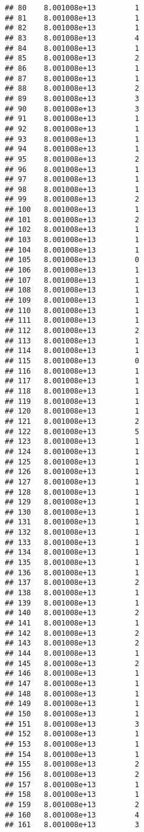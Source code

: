 \documentclass[
]{article}
\begin{document}
\begin{verbatim}
## 80    8.001008e+13         1
## 81    8.001008e+13         1
## 82    8.001008e+13         1
## 83    8.001008e+13         4
## 84    8.001008e+13         1
## 85    8.001008e+13         2
## 86    8.001008e+13         1
## 87    8.001008e+13         1
## 88    8.001008e+13         2
## 89    8.001008e+13         3
## 90    8.001008e+13         3
## 91    8.001008e+13         1
## 92    8.001008e+13         1
## 93    8.001008e+13         1
## 94    8.001008e+13         1
## 95    8.001008e+13         2
## 96    8.001008e+13         1
## 97    8.001008e+13         1
## 98    8.001008e+13         1
## 99    8.001008e+13         2
## 100   8.001008e+13         1
## 101   8.001008e+13         2
## 102   8.001008e+13         1
## 103   8.001008e+13         1
## 104   8.001008e+13         1
## 105   8.001008e+13         0
## 106   8.001008e+13         1
## 107   8.001008e+13         1
## 108   8.001008e+13         1
## 109   8.001008e+13         1
## 110   8.001008e+13         1
## 111   8.001008e+13         1
## 112   8.001008e+13         2
## 113   8.001008e+13         1
## 114   8.001008e+13         1
## 115   8.001008e+13         0
## 116   8.001008e+13         1
## 117   8.001008e+13         1
## 118   8.001008e+13         1
## 119   8.001008e+13         1
## 120   8.001008e+13         1
## 121   8.001008e+13         2
## 122   8.001008e+13         5
## 123   8.001008e+13         1
## 124   8.001008e+13         1
## 125   8.001008e+13         1
## 126   8.001008e+13         1
## 127   8.001008e+13         1
## 128   8.001008e+13         1
## 129   8.001008e+13         1
## 130   8.001008e+13         1
## 131   8.001008e+13         1
## 132   8.001008e+13         1
## 133   8.001008e+13         1
## 134   8.001008e+13         1
## 135   8.001008e+13         1
## 136   8.001008e+13         1
## 137   8.001008e+13         2
## 138   8.001008e+13         1
## 139   8.001008e+13         1
## 140   8.001008e+13         2
## 141   8.001008e+13         1
## 142   8.001008e+13         2
## 143   8.001008e+13         2
## 144   8.001008e+13         1
## 145   8.001008e+13         2
## 146   8.001008e+13         1
## 147   8.001008e+13         1
## 148   8.001008e+13         1
## 149   8.001008e+13         1
## 150   8.001008e+13         1
## 151   8.001008e+13         3
## 152   8.001008e+13         1
## 153   8.001008e+13         1
## 154   8.001008e+13         1
## 155   8.001008e+13         2
## 156   8.001008e+13         2
## 157   8.001008e+13         1
## 158   8.001008e+13         1
## 159   8.001008e+13         2
## 160   8.001008e+13         4
## 161   8.001008e+13         3

\end{verbatim}
\end{document}
